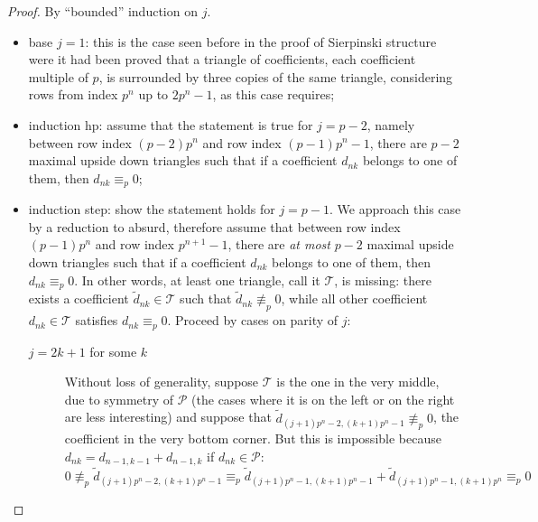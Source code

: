\documentclass[11pt,a4paper]{article} %
\begin{document}
    \begin{proof}
        By ``bounded'' induction on $j$.
        \begin{itemize}
            \item base $j=1$: this is the case seen before in the proof of
                Sierpinski structure were it had been proved that a triangle
                of coefficients, each coefficient multiple of $p$, is surrounded
                by three copies of the same triangle, considering rows from index 
                $p^n$ up to $2 p^n -1$, as this case requires;
            \item induction hp: assume that the statement is true for $j = p-2$, namely
                between row index $(p-2) p^n$ and row index $(p-1)p^n -1$, 
                there are $p-2$ maximal upside down triangles
                such that if a coefficient $d_{nk}$ belongs to one of them, then 
                $d_{nk} \equiv_{p} 0$; 
            \item induction step: show the statement holds for $j=p-1$. 
                We approach this case by a reduction to absurd, therefore assume that
                between row index $(p-1) p^n$ and row index $p^{n+1} -1$, 
                there are \emph{at most} $p-2$ maximal upside down triangles
                such that if a coefficient $d_{nk}$ belongs to one of them, then 
                $d_{nk} \equiv_{p} 0$. In other words, at least one triangle, call it $\mathcal{T}$,
                    is missing: there exists a coefficient
                    $\tilde{d}_{nk}\in\mathcal{T}$ such that $\tilde{d}_{nk}\not\equiv_{p}0$, while all 
                    other coefficient $d_{nk}\in\mathcal{T}$ satisfies $d_{nk} \equiv_{p}0$.
                    Proceed by cases on parity of $j$:
                \begin{description}
                    \item[$j=2k+1$ for some $k$] Without loss of generality, suppose $\mathcal{T}$ is the one in the 
                    very middle, due to symmetry of $\mathcal{P}$ (the cases where it is on the left or on the right are less interesting) and
                    suppose that $\tilde{d}_{(j+1) p^n -2, (k+1)p^n -1}\not\equiv_{p}0$, the coefficient in the very bottom corner.
                    But this is impossible because $d_{nk} = d_{n-1,k-1} + d_{n-1, k}$ if $d_{nk}\in \mathcal{P}$:
                    \begin{displaymath}
                    0\not\equiv_{p}\tilde{d}_{(j+1) p^n -2, (k+1)p^n -1} \equiv_{p} 
                        \tilde{d}_{(j+1) p^n -1, (k+1)p^n -1} + \tilde{d}_{(j+1) p^n -1, (k+1)p^n }\equiv_{p}0
                    \end{displaymath}


\end{description}
\end{itemize}
\end{proof}
\end{document}
